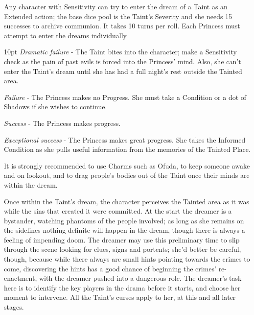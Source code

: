 Any character with Sensitivity can try to enter the dream of a Taint as an Extended action; the base dice pool is the Taint's Severity and she needs 15 successes to archive communion. It takes 10 turns per roll. Each Princess must attempt to enter the dreams individually 

   \begin{myindentpar}{10pt} \emph{Dramatic failure} - The Taint bites into the character; make a Sensitivity check as the pain of past evils is forced into the Princess' mind. Also, she can't enter the Taint's dream until she has had a full night's rest outside the Tainted area.
   
    \emph{Failure} - The Princess makes no Progress. She must take a Condition or a dot of Shadows if she wishes to continue. 
   
   \emph{Success} - The Princess makes progress.
   
   \emph{Exceptional success} - The Princess makes great progress. She takes the Informed Condition as she pulls useful information from the memories of the Tainted Place.\end{myindentpar}
   
It is strongly recommended to use Charms such as Ofuda, to keep someone awake and on lookout, and to drag people's bodies out of the Taint once their minds are within the dream. 

Once within the Taint's dream, the character perceives the Tainted area as it was while the sins that created it were committed. At the start the dreamer is a bystander, watching phantoms of the people involved; as long as she remains on the sidelines nothing definite will happen in the dream, though there is always a feeling of impending doom. The dreamer may use this preliminary time to slip through the scene looking for clues, signs and portents; she'd better be careful, though, because while there always are small hints pointing towards the crimes to come, discovering the hints has a good chance of beginning the crimes' re-enactment, with the dreamer pushed into a dangerous role. The dreamer's task here is to identify the key players in the drama before it starts, and choose her moment to intervene. All the Taint's curses apply to her, at this and all later stages.

